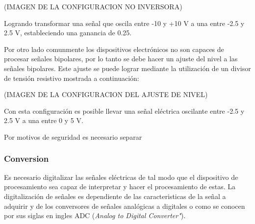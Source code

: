       (IMAGEN DE LA CONFIGURACION NO INVERSORA)

      \par Logrando transformar una señal que oscila entre -10 y +10 V a una entre -2.5 y 2.5 V, estableciendo una ganancia de 0.25.

      \par Por otro lado comunmente los dispositivos electrónicos no son capaces de procesar
      señales bipolares, por lo tanto se debe hacer un ajuste del nivel a las señales bipolares.
      Este ajuste se puede lograr mediante la utilización de un divisor de tensión resistivo
      mostrada a continuación:

      (IMAGEN DE LA CONFIGURACION DEL AJUSTE DE NIVEL)

      \par Con esta configuración es posible llevar una señal eléctrica oscilante entre -2.5 y 2.5 V a una entre 0 y 5 V.

      \par Por motivos de seguridad es necesario separar

    \subsubsection{Conversion}
      \par Es necesario digitalizar las señales eléctricas de tal modo que el dispositivo de procesamiento sea capaz de interpretar y hacer el procesamiento de estas. La digitalización de señales es dependiente de las caracteristicas de la señal a adquirir y de los conversores de señales analógicas a digitales o como se conocen por sus siglas en ingles ADC (\textit{Analog to Digital Converter"}).

